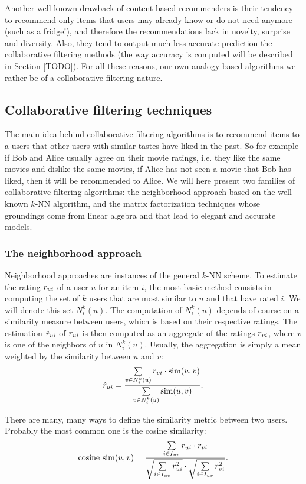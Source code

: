 Another well-known drawback of content-based recommenders is their tendency to
recommend only items that users may already know or do not need anymore (such
as a fridge!), and therefore the recommendations lack in novelty, surprise and
diversity. Also, they tend to output much less accurate prediction the
collaborative filtering methods (the way accuracy is computed will be described
in Section \ref{TODO}). For all these reasons, our own analogy-based algorithms
we rather be of a collaborative filtering nature.

\subsection{Collaborative filtering techniques}
\label{SEC:collaborative_filtering}

The main idea behind collaborative filtering algorithms is to recommend items
to a users that other users with similar tastes have liked in the past. So for
example if Bob and Alice usually agree on their movie ratings, i.e. they like
the same movies and dislike the same movies, if Alice has not seen a movie that
Bob has liked, then it will be recommended to Alice. We will here present two
families of collaborative filtering algorithms: the neighborhood approach based
on the well known $k$-NN algorithm, and the matrix factorization techniques
whose groundings come from linear algebra and that lead to elegant and accurate
models.

\subsubsection{The neighborhood approach}

Neighborhood approaches are instances of the general $k$-NN scheme. To estimate
the rating $r_{ui}$ of a user $u$ for an item $i$, the most basic method consists
in computing  the set of $k$ users that are most similar to $u$ and
that have rated $i$. We will denote this set $N_i^k(u)$. The computation of
$N_i^k(u)$ depends of course on a similarity measure between users, which is
based on their respective ratings.  The estimation $\hat{r}_{ui}$ of $r_{ui}$ is then
computed as an aggregate of the ratings $r_{vi}$, where $v$ is one of the
neighbors of $u$ in $N_i^k(u)$. Usually, the aggregation is simply a mean
weighted by the similarity between $u$ and $v$: $$\hat{r}_{ui} =
\frac{\sum\limits_{v \in N_i^k(u)}
r_{vi} \cdot \text{sim}(u, v)} {\sum\limits_{v \in N_i^k(u)}\text{sim}(u, v)}.$$

There are many, many ways to define the similarity metric between two users.
Probably the most common one is the cosine similarity:
$$
\text{cosine sim}(u, v) = \frac{ \sum\limits_{i \in I_{uv}} r_{ui} \cdot r_{vi}}
{\sqrt{\sum\limits_{i \in I_{uv}} r_{ui}^2} \cdot \sqrt{\sum\limits_{i \in I_{uv}}
r_{vi}^2}}.
$$

